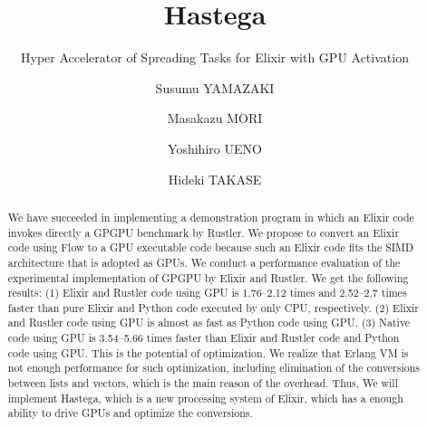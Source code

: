 \documentclass[sigplan,table]{acmart}
\begin{document}
\title{Hastega}
\subtitle{Hyper Accelerator of Spreading Tasks for Elixir with GPU Activation}

\author{Susumu YAMAZAKI}

\author{Masakazu MORI}

\author{Yoshihiro UENO}

\author{Hideki TAKASE}

\renewcommand{\shortauthors}{S. Yamazaki et al.}


\begin{abstract}
We have succeeded in implementing a demonstration program in which an Elixir code invokes directly a GPGPU benchmark by Rustler. We propose to convert an Elixir code using Flow to a GPU executable code because such an Elixir code fits the SIMD architecture that is adopted as GPUs. We conduct a performance evaluation of the experimental implementation of GPGPU by Elixir and Rustler. We get the following results: (1) Elixir and Rustler code using GPU is 1.76--2.12 times and 2.52--2.7 times faster than pure Elixir and Python code executed by only CPU, respectively. (2) Elixir and Rustler code using GPU is almost as fast as Python code using GPU. (3) Native code using GPU is 3.54--5.66 times faster than Elixir and Rustler code and Python code using GPU. This is the potential of optimization. We realize that Erlang VM is not enough performance for such optimization, including elimination of the conversions between lists and vectors, which is the main reason of the overhead. Thus, We will implement Hastega, which is a new processing system of Elixir, which has a enough ability to drive GPUs and optimize the conversions.
\end{abstract}
\end{document}
